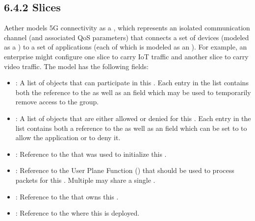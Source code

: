 \documentclass[a4paper,11pt,english]{sphinxmanual}
\begin{document}
\subsection{6.4.2 Slices}
\label{\detokenize{cloud:slices}}
\sphinxAtStartPar
Aether models 5G connectivity as a , which represents an
isolated communication channel (and associated QoS parameters) that
connects a set of devices (modeled as a ) to a set of
applications (each of which is modeled as an ). For
example, an enterprise might configure one slice to carry IoT traffic
and another slice to carry video traffic. The  model has the
following fields:
\begin{itemize}
\item {} 
\sphinxAtStartPar
{}: A list of  objects that can participate in this . Each
entry in the list contains both the reference to the  as well as an 
field which may be used to temporarily remove access to the group.

\item {} 
\sphinxAtStartPar
{}: A list of  objects that are either allowed or denied for this
. Each entry in the list contains both a reference to the  as well as an
 field which can be set to  to allow the application or  to deny it.

\item {} 
\sphinxAtStartPar
{}: Reference to the  that was used to initialize this .

\item {} 
\sphinxAtStartPar
{}: Reference to the User Plane Function () that should be
used to process packets for this . Multiple  may share
a single .

\item {} 
\sphinxAtStartPar
{}: Reference to the  that owns this .

\item {} 
\sphinxAtStartPar
{}: Reference to the  where this  is deployed.


\end{itemize}
\end{document}
